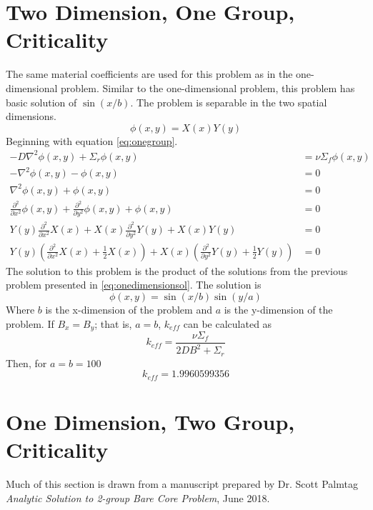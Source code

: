 \documentclass{article}
\begin{document}
\section{Two Dimension, One Group, Criticality}
  The same material coefficients are used for this problem as in the 
  one-dimensional problem. Similar to the one-dimensional problem, this 
  problem has basic solution of $\sin(x/b)$. The problem is separable in the 
  two spatial dimensions. 
  \begin{equation}
    \phi(x,y) = X(x) Y(y) 
  \end{equation}
  Beginning with equation \eqref{eq:onegroup}.
  \begin{align}
    -D \nabla^2 \phi(x,y) + \Sigma_r \phi(x,y) &= \nu \Sigma_f \phi(x,y) \\
    - \nabla^2 \phi(x,y) - \phi(x,y) &= 0 \\
    \nabla^2 \phi(x,y) + \phi(x,y) &= 0 \\
    \frac{\partial^2}{\partial x^2} \phi(x,y) + 
      \frac{\partial^2}{\partial y^2} \phi(x,y) +
      \phi(x,y) &= 0\\
    Y(y)\frac{\partial^2}{\partial x^2}X(x) +
      X(x) \frac{\partial^2}{\partial y^2} Y(y) + X(x)Y(y) &= 0\\
    Y(y)\left(\frac{\partial^2}{\partial x^2}X(x) + \frac{1}{2} X(x)\right)+
      X(x)\left(\frac{\partial^2}{\partial y^2}Y(y) + \frac{1}{2}Y(y)
      \right) &= 0
  \end{align}
  The solution to this problem is the product of the solutions from the 
  previous problem presented in \eqref{eq:onedimensionsol}. The solution is
  \begin{equation} \label{eq:twodimensionsol}
    \phi(x,y) = \sin(x/b) \sin(y/a)
  \end{equation}
  Where $b$ is the x-dimension of the problem and $a$ is the y-dimension of 
  the problem.
  If $B_x=B_y$; that is, $a=b$,  $k_{eff}$ can be calculated as
  \begin{equation}
    k_{eff} = \frac{\nu \Sigma_f}{2DB^2 + \Sigma_r} 
  \end{equation}
  Then, for $a = b = 100$
  \[ k_{eff} = 1.9960599356 \]
\section{One Dimension, Two Group, Criticality}
  Much of this section is drawn from a manuscript prepared by Dr. Scott 
  Palmtag \textit{Analytic Solution to 2-group Bare Core Problem}, June 2018.
  
\end{document}
